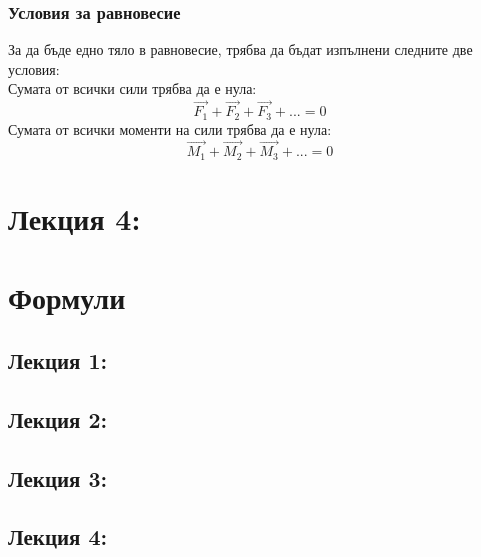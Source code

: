 \documentclass[fleqn]{article}
\begin{document}
\subsubsection{Условия за равновесие}
За да бъде едно тяло в равновесие, трябва да бъдат изпълнени следните две условия: \\
Сумата от всички сили трябва да е нула:
$$\vec{F_1} + \vec{F_2} + \vec{F_3} + ... = 0$$
Сумата от всички моменти на сили трябва да е нула:
$$\vec{M_1} + \vec{M_2} + \vec{M_3} + ... = 0$$

\newpage
\section{Лекция 4: }

\newpage
\section{Формули}

\subsection{Лекция 1:}

\subsection{Лекция 2:}

\subsection{Лекция 3: }

\subsection{Лекция 4: }
\end{document}
